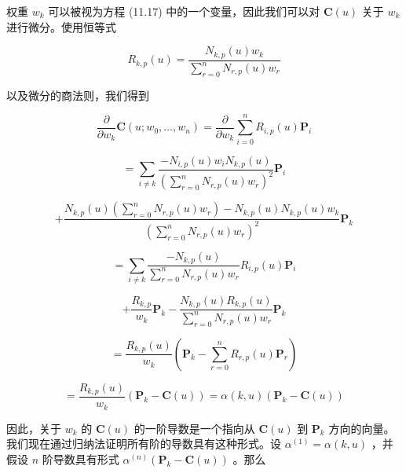 \documentclass[../main.tex]{subfiles}
\begin{document}
权重 \({w}_{k}\) 可以被视为方程 (11.17) 中的一个变量，因此我们可以对 \(\mathbf{C}\left( u\right)\) 关于 \({w}_{k}\) 进行微分。使用恒等式

\[
{R}_{k,p}\left( u\right)  = \frac{{N}_{k,p}\left( u\right) {w}_{k}}{\mathop{\sum }\limits_{{r = 0}}^{n}{N}_{r,p}\left( u\right) {w}_{r}}
\]

以及微分的商法则，我们得到

\[
\frac{\partial }{\partial {w}_{k}}\mathbf{C}\left( {u;{w}_{0},\ldots ,{w}_{n}}\right)  = \frac{\partial }{\partial {w}_{k}}\mathop{\sum }\limits_{{i = 0}}^{n}{R}_{i,p}\left( u\right) {\mathbf{P}}_{i}
\]

\[
= \mathop{\sum }\limits_{{i \neq  k}}\frac{-{N}_{i,p}\left( u\right) {w}_{i}{N}_{k,p}\left( u\right) }{{\left( \mathop{\sum }\limits_{{r = 0}}^{n}{N}_{r,p}\left( u\right) {w}_{r}\right) }^{2}}{\mathbf{P}}_{i}
\]

\[
+ \frac{{N}_{k,p}\left( u\right) \left( {\mathop{\sum }\limits_{{r = 0}}^{n}{N}_{r,p}\left( u\right) {w}_{r}}\right)  - {N}_{k,p}\left( u\right) {N}_{k,p}\left( u\right) {w}_{k}}{{\left( \mathop{\sum }\limits_{{r = 0}}^{n}{N}_{r,p}\left( u\right) {w}_{r}\right) }^{2}}{\mathbf{P}}_{k}
\]

\[
= \mathop{\sum }\limits_{{i \neq  k}}\frac{-{N}_{k,p}\left( u\right) }{\mathop{\sum }\limits_{{r = 0}}^{n}{N}_{r,p}\left( u\right) {w}_{r}}{R}_{i,p}\left( u\right) {\mathbf{P}}_{i}
\]

\[
+ \frac{{R}_{k,p}}{{w}_{k}}{\mathbf{P}}_{k} - \frac{{N}_{k,p}\left( u\right) {R}_{k,p}\left( u\right) }{\mathop{\sum }\limits_{{r = 0}}^{n}{N}_{r,p}\left( u\right) {w}_{r}}{\mathbf{P}}_{k}
\]

\[
= \frac{{R}_{k,p}\left( u\right) }{{w}_{k}}\left( {{\mathbf{P}}_{k} - \mathop{\sum }\limits_{{r = 0}}^{n}{R}_{r,p}\left( u\right) {\mathbf{P}}_{r}}\right)
\]

\[
= \frac{{R}_{k,p}\left( u\right) }{{w}_{k}}\left( {{\mathbf{P}}_{k} - \mathbf{C}\left( u\right) }\right)  = \alpha \left( {k,u}\right) \left( {{\mathbf{P}}_{k} - \mathbf{C}\left( u\right) }\right)  \tag{11.18}
\]

因此，关于 \({w}_{k}\) 的 \(\mathbf{C}\left( u\right)\) 的一阶导数是一个指向从 \(\mathbf{C}\left( u\right)\) 到 \({\mathbf{P}}_{k}\) 方向的向量。我们现在通过归纳法证明所有阶的导数具有这种形式。设 \({\alpha }^{\left( 1\right) } = \alpha \left( {k,u}\right)\) ，并假设 \(n\) 阶导数具有形式 \({\alpha }^{\left( n\right) }\left( {{\mathbf{P}}_{k} - \mathbf{C}\left( u\right) }\right)\) 。那么
\end{document}
